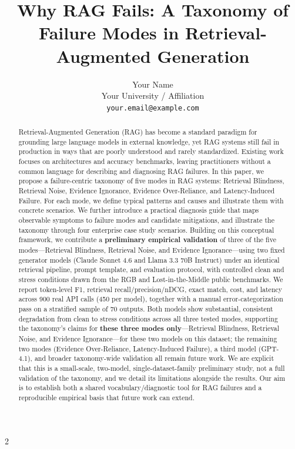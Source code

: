 \documentclass[11pt,a4paper]{article}
\title{\vspace{-1.5cm}Why RAG Fails: A Taxonomy of Failure Modes in Retrieval-Augmented Generation}
\author{Your Name \\
Your University / Affiliation \\
\texttt{your.email@example.com}
}
\date{}
\begin{document}
\maketitle

\begin{multicols}{2}

\begin{abstract}
Retrieval-Augmented Generation (RAG) has become a standard paradigm for grounding large language models in external knowledge, yet RAG systems still fail in production in ways that are poorly understood and rarely standardized. Existing work focuses on architectures and accuracy benchmarks, leaving practitioners without a common language for describing and diagnosing RAG failures. In this paper, we propose a failure-centric taxonomy of five modes in RAG systems: Retrieval Blindness, Retrieval Noise, Evidence Ignorance, Evidence Over-Reliance, and Latency-Induced Failure. For each mode, we define typical patterns and causes and illustrate them with concrete scenarios. We further introduce a practical diagnosis guide that maps observable symptoms to failure modes and candidate mitigations, and illustrate the taxonomy through four enterprise case study scenarios. Building on this conceptual framework, we contribute a \textbf{preliminary empirical validation} of three of the five modes---Retrieval Blindness, Retrieval Noise, and Evidence Ignorance---using two fixed generator models (Claude Sonnet 4.6 and Llama 3.3 70B Instruct) under an identical retrieval pipeline, prompt template, and evaluation protocol, with controlled clean and stress conditions drawn from the RGB and Lost-in-the-Middle public benchmarks. We report token-level F1, retrieval recall/precision/nDCG, exact match, cost, and latency across 900 real API calls (450 per model), together with a manual error-categorization pass on a stratified sample of 70 outputs. Both models show substantial, consistent degradation from clean to stress conditions across all three tested modes, supporting the taxonomy's claims for \textbf{these three modes only}---Retrieval Blindness, Retrieval Noise, and Evidence Ignorance---for these two models on this dataset; the remaining two modes (Evidence Over-Reliance, Latency-Induced Failure), a third model (GPT-4.1), and broader taxonomy-wide validation all remain future work. We are explicit that this is a small-scale, two-model, single-dataset-family preliminary study, not a full validation of the taxonomy, and we detail its limitations alongside the results. Our aim is to establish both a shared vocabulary/diagnostic tool for RAG failures and a reproducible empirical basis that future work can extend.
\end{abstract}


\end{multicols}
\end{document}
